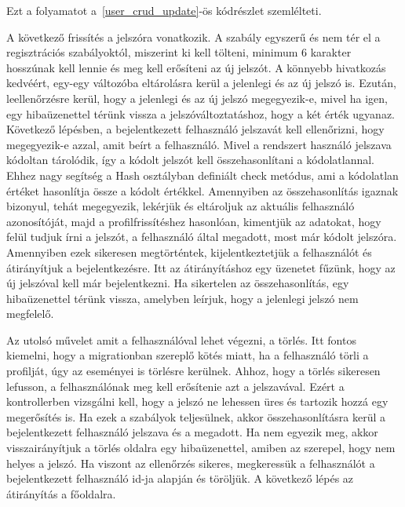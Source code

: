 \documentclass[
]{thesis-ekf}
\theoremstyle{definition}
\theoremstyle{remark}
\begin{document}
	Ezt a folyamatot a~\ref{user_crud_update}-ös kódrészlet szemlélteti.
	
	
	
	A következő frissítés a jelszóra vonatkozik. A szabály egyszerű és nem tér el a regisztrációs szabályoktól, miszerint ki kell tölteni, minimum 6 karakter hosszúnak kell lennie és meg kell erősíteni az új jelszót. A könnyebb hivatkozás kedvéért, egy-egy változóba eltárolásra kerül a jelenlegi és az új jelszó is. Ezután, leellenőrzésre kerül, hogy a jelenlegi és az új jelszó megegyezik-e, mivel ha igen, egy hibaüzenettel térünk vissza a jelszóváltoztatáshoz, hogy a két érték ugyanaz. Következő lépésben, a bejelentkezett felhasználó jelszavát kell ellenőrizni, hogy megegyezik-e azzal, amit beírt a felhasználó. Mivel a rendszert használó jelszava kódoltan tárolódik, így a kódolt jelszót kell összehasonlítani a kódolatlannal. Ehhez nagy segítség a Hash osztályban definiált check metódus, ami a kódolatlan értéket hasonlítja össze a kódolt értékkel. Amennyiben az összehasonlítás igaznak bizonyul, tehát megegyezik, lekérjük és eltároljuk az aktuális felhasználó azonosítóját, majd a profilfrissítéshez hasonlóan, kimentjük az adatokat, hogy felül tudjuk írni a jelszót, a felhasználó által megadott, most már kódolt jelszóra. Amennyiben ezek sikeresen megtörténtek, kijelentkeztetjük a felhasználót és átirányítjuk a bejelentkezésre. Itt az átirányításhoz egy üzenetet fűzünk, hogy az új jelszóval kell már bejelentkezni. Ha sikertelen az összehasonlítás, egy hibaüzenettel térünk vissza, amelyben leírjuk, hogy a jelenlegi jelszó nem megfelelő. 
	
	Az utolsó művelet amit a felhasználóval lehet végezni, a törlés. Itt fontos kiemelni, hogy a migrationban szereplő kötés miatt, ha a felhasználó törli a profilját, úgy az eseményei is törlésre kerülnek. Ahhoz, hogy a törlés sikeresen lefusson, a felhasználónak meg kell erősítenie azt a jelszavával. Ezért a kontrollerben vizsgálni kell, hogy a jelszó ne lehessen üres és tartozik hozzá egy megerősítés is. Ha ezek a szabályok teljesülnek, akkor összehasonlításra kerül a bejelentkezett felhasználó jelszava és a megadott. Ha nem egyezik meg, akkor visszairányítjuk a törlés oldalra egy hibaüzenettel, amiben az szerepel, hogy nem helyes a jelszó. Ha viszont az ellenőrzés sikeres, megkeressük a felhasználót a bejelentkezett felhasználó id-ja alapján és töröljük. A következő lépés az átirányítás a főoldalra.
	
\end{document}
